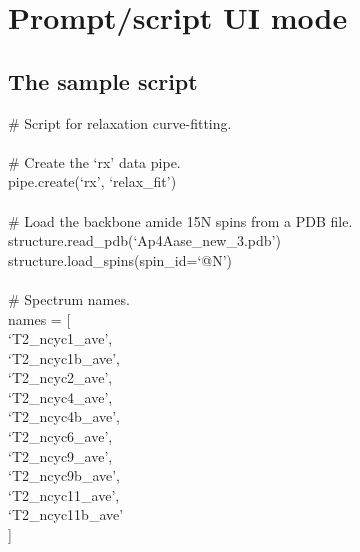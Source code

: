 \section{Prompt/script UI mode}



\subsection{The sample script}

\begin{exampleenv}
\# Script for relaxation curve-fitting. \\
 \\
\# Create the `rx' data pipe. \\
pipe.create(`rx', `relax\_fit') \\
 \\
\# Load the backbone amide 15N spins from a PDB file. \\
structure.read\_pdb(`Ap4Aase\_new\_3.pdb') \\
structure.load\_spins(spin\_id=`@N') \\
 \\
\# Spectrum names. \\
names = [ \\
\hspace*{4ex} `T2\_ncyc1\_ave', \\
\hspace*{4ex} `T2\_ncyc1b\_ave', \\
\hspace*{4ex} `T2\_ncyc2\_ave', \\
\hspace*{4ex} `T2\_ncyc4\_ave', \\
\hspace*{4ex} `T2\_ncyc4b\_ave', \\
\hspace*{4ex} `T2\_ncyc6\_ave', \\
\hspace*{4ex} `T2\_ncyc9\_ave', \\
\hspace*{4ex} `T2\_ncyc9b\_ave', \\
\hspace*{4ex} `T2\_ncyc11\_ave', \\
\hspace*{4ex} `T2\_ncyc11b\_ave' \\
] \\
 \\

\end{exampleenv}
